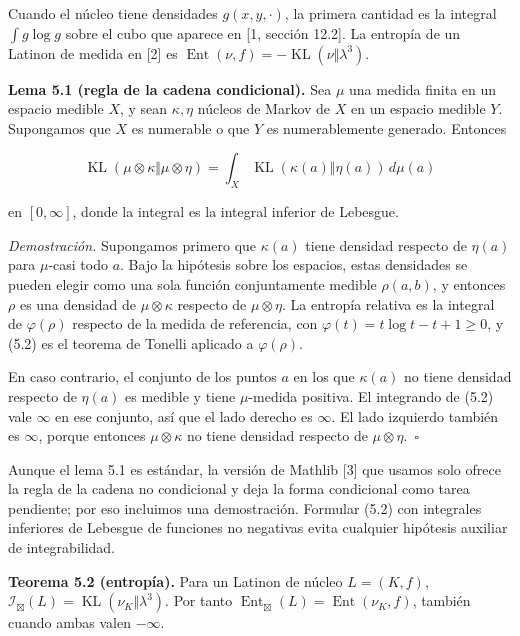 \documentclass[spanish,11pt,a4paper]{article}
\begin{document}
Cuando el núcleo tiene densidades \(g(x,y,\cdot)\), la primera cantidad es la integral \(\int g\log g\) sobre el cubo que aparece en {[}1, sección 12.2{]}. La entropía de un Latinon de medida en {[}2{]} es \(\operatorname{Ent}(\nu,f)=-\operatorname{KL}(\nu\Vert\lambda^3)\).

\textbf{Lema 5.1 (regla de la cadena condicional).} Sea \(\mu\) una medida finita en un espacio medible \(X\), y sean \(\kappa,\eta\) núcleos de Markov de \(X\) en un espacio medible \(Y\). Supongamos que \(X\) es numerable o que \(Y\) es numerablemente generado. Entonces

\nopagebreak[4]
\[\operatorname{KL}(\mu\otimes\kappa\Vert\mu\otimes\eta)=\int_X\operatorname{KL}(\kappa(a)\Vert\eta(a))\,d\mu(a)\tag{5.2}\]

en \([0,\infty]\), donde la integral es la integral inferior de Lebesgue.

\emph{Demostración.} Supongamos primero que \(\kappa(a)\) tiene densidad respecto de \(\eta(a)\) para \(\mu\)-casi todo \(a\). Bajo la hipótesis sobre los espacios, estas densidades se pueden elegir como una sola función conjuntamente medible \(\rho(a,b)\), y entonces \(\rho\) es una densidad de \(\mu\otimes\kappa\) respecto de \(\mu\otimes\eta\). La entropía relativa es la integral de \(\varphi(\rho)\) respecto de la medida de referencia, con \(\varphi(t)=t\log t-t+1\ge0\), y (5.2) es el teorema de Tonelli aplicado a \(\varphi(\rho)\).

En caso contrario, el conjunto de los puntos \(a\) en los que \(\kappa(a)\) no tiene densidad respecto de \(\eta(a)\) es medible y tiene \(\mu\)-medida positiva. El integrando de (5.2) vale \(\infty\) en ese conjunto, así que el lado derecho es \(\infty\). El lado izquierdo también es \(\infty\), porque entonces \(\mu\otimes\kappa\) no tiene densidad respecto de \(\mu\otimes\eta\).~\(\square\)

Aunque el lema 5.1 es estándar, la versión de Mathlib {[}3{]} que usamos solo ofrece la regla de la cadena no condicional y deja la forma condicional como tarea pendiente; por eso incluimos una demostración. Formular (5.2) con integrales inferiores de Lebesgue de funciones no negativas evita cualquier hipótesis auxiliar de integrabilidad.

\textbf{Teorema 5.2 (entropía).} Para un Latinon de núcleo \(L=(K,f)\), \(\mathcal I_{\boxtimes}(L)=\operatorname{KL}(\nu_K\Vert\lambda^3)\). Por tanto \(\operatorname{Ent}_{\boxtimes}(L)=\operatorname{Ent}(\nu_K,f)\), también cuando ambas valen \(-\infty\).
\end{document}
